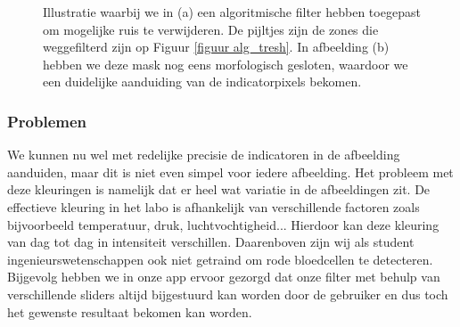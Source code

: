 \documentclass[a4paper,kulak]{kulakarticle}
\begin{document}
\begin{figure}[H]
	\centering
	\qquad
	
	\caption{Illustratie waarbij we in (a) een algoritmische filter hebben toegepast om mogelijke ruis te verwijderen. De pijltjes zijn de zones die weggefilterd zijn op Figuur \ref{figuur alg_tresh}. In afbeelding (b) hebben we deze mask nog eens morfologisch gesloten, waardoor we een duidelijke aanduiding van de indicatorpixels bekomen.}
	\label{figuur morf}
\end{figure}

\subsubsection{Problemen}
We kunnen nu wel met redelijke precisie de indicatoren in de afbeelding aanduiden, maar dit is niet even simpel voor iedere afbeelding.
Het probleem met deze kleuringen is namelijk dat er heel wat variatie in de afbeeldingen zit. De effectieve kleuring in het labo is afhankelijk van verschillende factoren zoals bijvoorbeeld temperatuur, druk, luchtvochtigheid... Hierdoor kan deze kleuring van dag tot dag in intensiteit verschillen. Daarenboven zijn wij als student ingenieurswetenschappen ook niet getraind om rode bloedcellen te detecteren. Bijgevolg hebben we in onze app ervoor gezorgd dat onze filter met behulp van verschillende sliders altijd bijgestuurd kan worden door de gebruiker en dus toch het gewenste resultaat bekomen kan worden.
\end{document}
